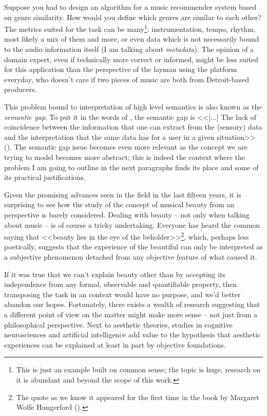 Suppose you had to design an algorithm for a music recommender system based on genre similarity. How would you define which genres are similar to each other? The metrics suited for the task can be many\footnote{This is just an example built on common sense; the topic is huge, research on it is abundant and beyond the scope of this work.}: instrumentation, tempo, rhythm, most likely a mix of them and more, or even data which is not necessarily bound to the audio information itself (I am talking about \emph{metadata}). The opinion of a domain expert, even if technically more correct or informed, might be less suited for this application than the perspective of the layman using the platform everyday, who doesn't care if two pieces of music are both from Detroit-based producers.

This problem bound to interpretation of high level semantics is also known as the \emph{semantic gap}. To put it in the words of \citeauthor{smeulders2000content}, the semantic gap is <<[...] The lack of coincidence between the information that one can extract from the (sensory) data and the interpretation that the same data has for a
user in a given situation>> (\cite{smeulders2000content}). The semantic gap issue becomes even more relevant as the concept we are trying to model becomes more abstract; this is indeed the context where the problem I am going to outline in the next paragraphs finds its place and some of its practical justifications.

Given the promising advances seen in the field in the last fifteen years, it is surprising to see how the study of the concept of musical beauty from an  perspective is barely considered. Dealing with beauty -- not only when talking about music -- is of course a tricky undertaking. Everyone has heard the common saying that <<beauty lies in the eye of the beholder>>\footnote{The quote as we know it appeared for the first time in the book  by Margaret Wolfe Hungerford  (\cite{hungerford1878molly}).}, which, perhaps less poetically, suggests that the experience of the beautiful can only be interpreted as a subjective phenomenon detached from any objective feature of what caused it.

If it was true that we can't explain beauty other than by accepting its independence from any formal, observable and quantifiable property, then transposing the task in an  context would have no purpose, and we'd better abandon our hopes. Fortunately, there exists a wealth of research suggesting that a different point of view on the matter might make more sense -- not just from a philosophical perspective. Next to aesthetic theories, studies in cognitive neurosciences and artificial intelligence add value to the hypothesis that aesthetic experiences can be explained at least in part by objective foundations.

